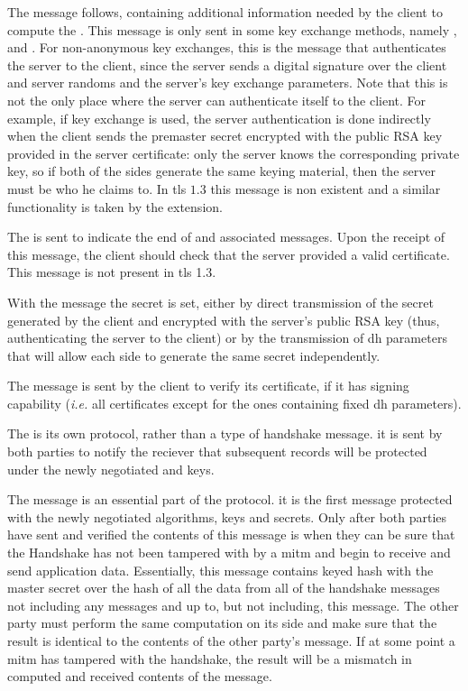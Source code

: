 \documentclass{llncs}
\begin{document}
The  message follows, containing additional information
needed by the client to compute the . This message
is only sent in some key exchange methods, namely , 
and . For non-anonymous key exchanges, this is the message that authenticates the server to the client,
since the server sends a digital signature over the client and server randoms
and the server's key exchange parameters. Note that this is not the only place where the
server can authenticate itself to the client. For example, if  key
exchange is used, the server authentication is done indirectly when the client
sends the premaster secret encrypted with the public RSA key provided in the
server certificate: only the server knows the corresponding private key, so if
both of the sides generate the same keying material, then the server must be who
he claims to. In \gls{tls} $1.3$ this message is non existent and a similar
functionality is taken by the  extension.

The  is sent to indicate the end of 
and associated messages. Upon the receipt of this message, the client should check
that the server provided a valid certificate. This message is not present in \gls{tls} 1.3.

With the  message the  secret is
set, either by direct transmission of the secret generated by the client
and encrypted with the server's public RSA key (thus, authenticating the server to the client)
or by the transmission of \gls{dh} parameters that will allow each side to generate
the same  secret independently.

The  message is sent by the client to verify its
certificate, if it has signing capability (\textit{i.e.} all certificates except for the ones
containing fixed \gls{dh} parameters).

The  is its own protocol, rather than a type of handshake
message. it is sent by both parties to notify the reciever that subsequent records
will be protected under the newly negotiated  and keys.

The  message is an essential part of the protocol. it is the first
message protected with the newly negotiated algorithms, keys and secrets. Only after
both parties have sent and verified the contents of this message is when they can
be sure that the Handshake has not been tampered with by a \gls{mitm} and begin to
receive and send application data. Essentially, this message contains keyed hash
with the master secret over the hash of all the data from all of the
handshake messages not including any  messages and up to, but
not including, this message. The other party must perform the same computation on its
side and make sure that the result is identical to the contents of the other party's
 message. If at some point a \gls{mitm} has tampered with the
handshake, the result will be a mismatch in computed and received contents of the
 message.
\end{document}
